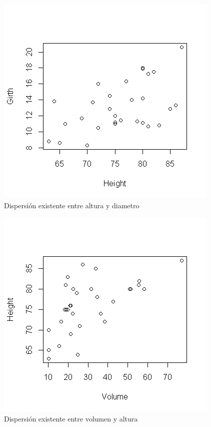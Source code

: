 \documentclass[12pt,a4paper]{article}
\begin{document}
\begin{figure}
\centering
\includegraphics[scale=0.9]{disp2}
\caption{Dispersión existente entre  altura y diametro}
\label{fig:disp2}
\end{figure}

\begin{figure}
\centering
\includegraphics[scale=0.9]{disp3}
\caption{Dispersión existente entre volumen y altura}
\label{fig:disp3}
\end{figure}

\newpage
\end{document}
